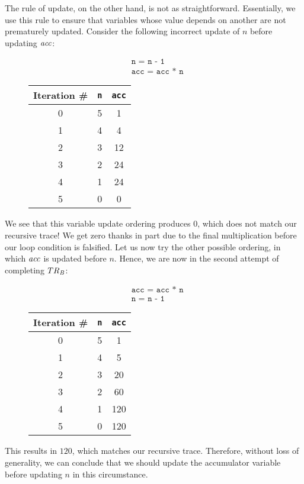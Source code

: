 The rule of update, on the other hand, is not as straightforward. Essentially, we use this rule to ensure that variables whose value depends on another are not prematurely updated. Consider the following incorrect update of $n$ before updating $\emph{acc}$:
\begin{figure}[H]
\centering
\begin{minipage}{.4\textwidth}
  \begin{align*}
  &\texttt{n = n - 1}\\
  &\texttt{acc = acc * n}
  \end{align*}
\end{minipage}%
\begin{minipage}{.4\textwidth}
\begin{tabular}{c|c|c}
Iteration \# & \texttt{n} & \texttt{acc}\\
\hline
\hline
0 & 5 & 1\\
\hline
1 & 4 & 4\\
\hline
2 & 3 & 12\\
\hline
3 & 2 & 24\\
\hline
4 & 1 & 24\\
\hline
5 & 0 & 0\\
\end{tabular}
\end{minipage}
\end{figure}
We see that this variable update ordering produces $0$, which does not match our recursive trace! We get zero thanks in part due to the final multiplication before our loop condition is falsified. Let us now try the other possible ordering, in which $\emph{acc}$ is updated before $n$. Hence, we are now in the second attempt of completing $TR_\emph{B}$:
\begin{figure}[H]
\centering
\begin{minipage}{.4\textwidth}
  \begin{align*}
  &\texttt{acc = acc * n}\\
  &\texttt{n = n - 1}
  \end{align*}
\end{minipage}%
\begin{minipage}{.4\textwidth}
\begin{tabular}{c|c|c}
Iteration \# & \texttt{n} & \texttt{acc}\\
\hline
\hline
0 & 5 & 1\\
\hline
1 & 4 & 5\\
\hline
2 & 3 & 20\\
\hline
3 & 2 & 60\\
\hline
4 & 1 & 120\\
\hline
5 & 0 & 120\\
\end{tabular}
\end{minipage}
\end{figure}
This results in $120$, which matches our recursive trace. Therefore, without loss of generality, we can conclude that we should update the accumulator variable before updating $n$ in this circumstance.

